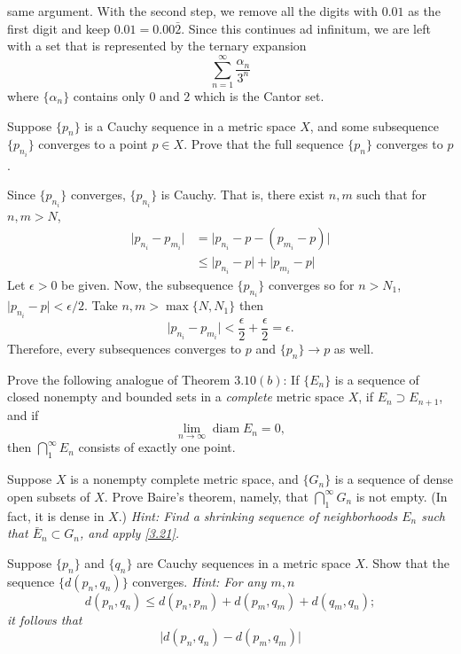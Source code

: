 \begin{exercise}
  same argument.
  With the second step, we remove all the digits with \(0.01\) as the first
  digit and keep \(0.01 = 0.00\bar{2}\).
  Since this continues ad infinitum, we are left with a set that is
  represented by the ternary expansion
  \[
  \sum_{n = 1}^{\infty}\frac{\alpha_n}{3^n}
  \]
  where \(\{\alpha_n\}\) contains only \(0\) and \(2\) which is the Cantor set.
\item
  Suppose \(\{p_n\}\) is a Cauchy sequence in a metric space \(X\), and some
  subsequence \(\{p_{n_i}\}\) converges to a point \(p\in X\).
  Prove that the full sequence \(\{p_n\}\) converges to \(p\).
  \par\smallskip
  Since \(\{p_{n_i}\}\) converges, \(\{p_{n_i}\}\) is Cauchy.
  That is, there exist \(n,m\) such that for \(n,m > N\),
  \begin{align*}
    \lvert p_{n_i} - p_{m_i}\rvert
    & = \lvert p_{n_i} - p - (p_{m_i} - p)\rvert\\
    & \leq \lvert p_{n_i} - p\rvert + \lvert p_{m_i} - p\rvert
  \end{align*}
  Let \(\epsilon > 0\) be given.
  Now, the subsequence \(\{p_{n_i}\}\) converges so for \(n > N_1\),
  \(\lvert p_{n_i} - p\rvert < \epsilon/2\).
  Take \(n,m > \max\{N, N_1\}\) then
  \[
  \lvert p_{n_i} - p_{m_i}\rvert < \frac{\epsilon}{2} + \frac{\epsilon}{2}
  = \epsilon.
  \]
  Therefore, every subsequences converges to \(p\) and \(\{p_n\}\to p\) as
  well.
\item
  \label{3.21}
  Prove the following analogue of Theorem \(3.10(b)\): If \(\{E_n\}\) is a
  sequence of closed nonempty and bounded sets in a \textit{complete} metric
  space \(X\), if \(E_n\supset E_{n + 1}\), and if
  \[
  \lim_{n\to\infty}\operatorname{diam} E_n = 0,
  \]
  then \(\bigcap_1^{\infty}E_n\) consists of exactly one point.
\item
  Suppose \(X\) is a nonempty complete metric space, and \(\{G_n\}\) is a
  sequence of dense open subsets of \(X\).
  Prove Baire's theorem, namely, that \(\bigcap_1^{\infty}G_n\) is not empty.
  (In fact, it is dense in \(X\).)
  \textit{Hint: Find a shrinking sequence of neighborhoods \(E_n\) such that
    \(\bar{E}_n\subset G_n\), and apply \cref{3.21}.}
\item
  \label{3.23}
  Suppose \(\{p_n\}\) and \(\{q_n\}\) are Cauchy sequences in a metric space
  \(X\).
  Show that the sequence \(\{d(p_n,q_n)\}\) converges.
  \textit{Hint: For any \(m,n\)
    \[
    d(p_n, q_n)\leq d(p_n, p_m) + d(p_m, q_m) + d(q_m, q_n);
    \]
    it follows that
    \[
    \lvert d(p_n, q_n) - d(p_m, q_m)\rvert
\]}
\end{exercise}
